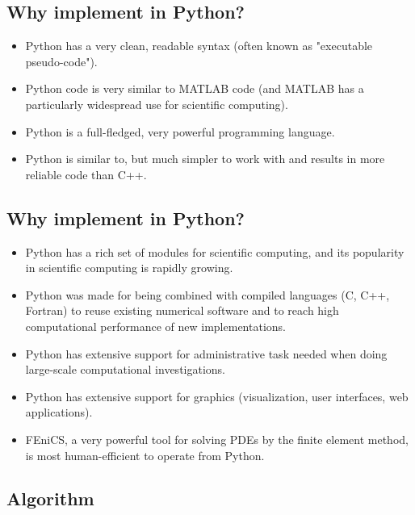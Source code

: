 \documentclass[%
oneside,                 %
final,                   %
10pt]{article}
\begin{document}
\subsection*{Why implement in Python?}

\begin{itemize}
  \item Python has a very clean, readable syntax (often known as
    "executable pseudo-code").

  \item Python code is very similar to MATLAB code (and MATLAB has a
    particularly widespread use for scientific computing).

  \item Python is a full-fledged, very powerful programming language.

  \item Python is similar to, but much simpler to work with and
    results in more reliable code than C++.
\end{itemize}

\noindent
\subsection*{Why implement in Python?}

\begin{itemize}
  \item Python has a rich set of modules for scientific computing, and its
    popularity in scientific computing is rapidly growing.

  \item Python was made for being combined with compiled languages
    (C, C++, Fortran) to reuse existing numerical software and to
    reach high computational performance of new implementations.

  \item Python has extensive support for administrative task
    needed when doing large-scale computational investigations.

  \item Python has extensive support for graphics (visualization,
    user interfaces, web applications).

  \item FEniCS, a very powerful tool for solving PDEs by
    the finite element method, is most human-efficient to operate
    from Python.
\end{itemize}

\noindent
\subsection*{Algorithm}
\label{decay:py1}
\end{document}
